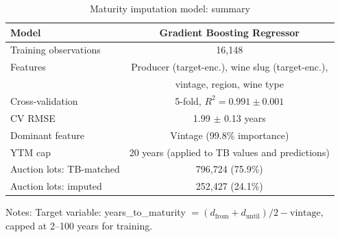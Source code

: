 \begin{table}[htbp]
\centering
\caption{Maturity imputation model: summary}
\label{tab:maturity_imputation}
\small
\begin{threeparttable}
\begin{tabular}{lc}
\toprule
Model & Gradient Boosting Regressor \\
\midrule
Training observations & 16,148 \\
Features & Producer (target-enc.), wine slug (target-enc.), \\
         & vintage, region, wine type \\
Cross-validation & 5-fold, $R^2 = 0.991 \pm 0.001$ \\
CV RMSE & 1.99 $\pm$ 0.13 years \\
Dominant feature & Vintage (99.8\% importance) \\
YTM cap & 20 years (applied to TB values and predictions) \\
\midrule
Auction lots: TB-matched & 796,724 (75.9\%) \\
Auction lots: imputed & 252,427 (24.1\%) \\
\bottomrule
\end{tabular}
\begin{tablenotes}
\footnotesize
\item Notes: Target variable: years\_to\_maturity $= (d_{\text{from}} + d_{\text{until}})/2 - \text{vintage}$,
  capped at 2--100 years for training.
\end{tablenotes}
\end{threeparttable}
\end{table}
